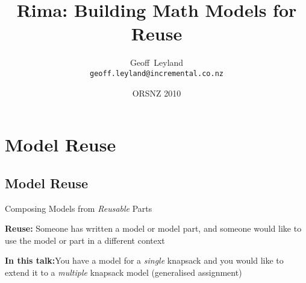 \documentclass[smaller]{beamer}
\title[Rima]{Rima: Building Math Models for Reuse}
\author[Geoff~Leyland]{Geoff~Leyland \\ \texttt{geoff.leyland@incremental.co.nz}}
\institute[Incremental Limited] {Incremental Limited}
\date[ORSNZ 2010]{ORSNZ 2010}
\begin{document}

\begin{frame}
  \titlepage
\end{frame}



\section{Model Reuse}

\subsection{Model Reuse}
\begin{frame}{Composing Models from \emph{Reusable} Parts}


  {\bf Reuse:} Someone has written a model or model part,
  and someone would like to use the model or part in a different context

  {\bf In this talk:}You have a model for a \emph{single} knapsack
  and you would like to extend it to a \emph{multiple} knapsack model (generalised assignment)
\end{frame}


\end{document}

